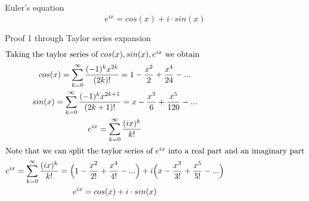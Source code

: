 \documentclass[a4paper]{article}
\begin{document}
\begin{theorem}
Euler's equation
\begin{equation}
\boxed{
e^{ix} = cos(x) + i \cdot sin(x)
}
\end{equation}

Proof 1 through Taylor series expansion
\begin{gather*}
\intertext{Taking the taylor series of $cos(x), sin(x), e^{ix}$ we obtain}
cos(x) = \sum_{k=0}^{\infty} \frac{(-1)^k x^{2k}}{(2k)!} = 1 - \frac{x^2}{2} + \frac{x^4}{24} - ...
\\
sin(x) = \sum_{k=0}^{\infty} \frac{(-1)^k x^{2k+1}}{(2k + 1)!}
= x - \frac{x^3}{6} + \frac{x^5}{120} - ...
\\
e^{ix} = \sum_{k=0}^{\infty} \frac{ (ix)^{k}}{k!}
\\
\intertext{Note that we can split the taylor series of $e^{ix}$ into a real part and an imaginary part}
e^{ix} = \sum_{k=0}^{\infty} \frac{ (ix)^{k}}{k!} = \Big( 1 - \frac{x^2}{2!} + \frac{x^4}{4!} - ... \Big) + i \Big( x - \frac{x^3}{3!} + \frac{x^5}{5!} - ... \Big)
\\
e^{ix} = cos(x) + i \cdot sin(x)
\end{gather*}


\end{theorem}
\end{document}

